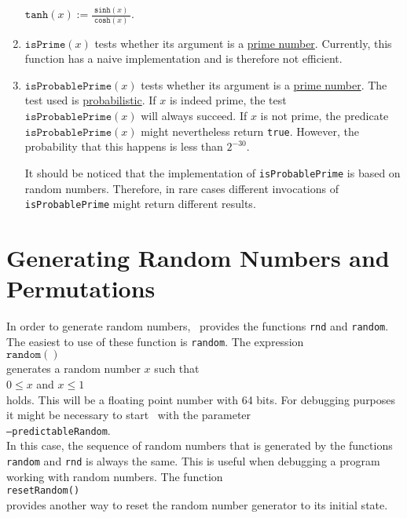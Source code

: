 \begin{enumerate}
      \hspace*{1.3cm}
      $\mathtt{tanh}(x) := \displaystyle \frac{\;\mathtt{sinh}(x)\;}{\mathtt{cosh}(x)}$.
\item $\texttt{isPrime}(x)$ tests whether its argument is a 
      \href{https://en.wikipedia.org/wiki/Prime_number}{prime number}.  Currently, 
      this function has a naive implementation and is therefore not efficient.
\item $\texttt{isProbablePrime}(x)$ tests whether its argument is a
      \href{https://en.wikipedia.org/wiki/Prime_number}{prime number}.  The test 
      used is 
      \href{https://en.wikipedia.org/wiki/Miller-Rabin-primality_test}{probabilistic}.  If
      $x$ is indeed  prime, the test $\texttt{isProbablePrime}(x)$ 
      will always succeed.  If $x$ is not prime, the predicate $\texttt{isProbablePrime}(x)$
      might nevertheless return \texttt{true}.  However, the probability that this happens
      is less than $2^{-30}$.

      It should be noticed that the implementation of \texttt{isProbablePrime} is
      based on random numbers.  Therefore, in rare cases different invocations of
      \texttt{isProbablePrime} might return different results.  
\end{enumerate}


\section{Generating Random Numbers and Permutations}
In order to generate random numbers, \setlx\ provides the functions \texttt{rnd} and
\texttt{random}.  The easiest to use of these function is \texttt{random}.  The expression
\\[0.2cm]
\hspace*{1.3cm}
$\texttt{random}()$
\\[0.2cm]
generates a random number $x$ such that 
\\[0.2cm]
\hspace*{1.3cm}
$0 \leq x$ \quad and \quad $x \leq 1$
\\[0.2cm]
holds.  This will be a floating point number with 64 bits.  For debugging purposes it might be necessary to start \setlx\ with
the parameter
\\[0.2cm]
\hspace*{1.3cm}
\texttt{--predictableRandom}.
\\[0.2cm]
In this case, the sequence of random numbers that is generated by the functions \texttt{random} and
\texttt{rnd} is always the same.  This is useful when debugging a program working with
random numbers.  The function 
\\[0.2cm]
\hspace*{1.3cm}
\texttt{resetRandom()}
\\[0.2cm]
provides another way to reset the random number generator to its initial state.

